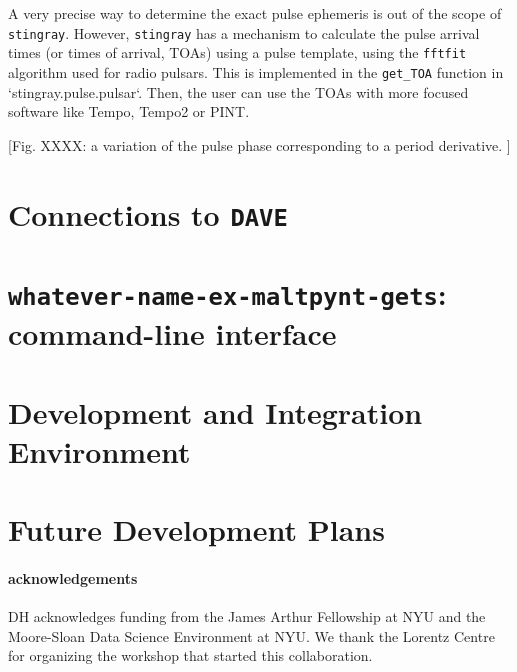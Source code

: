 \documentclass[12pt]{emulateapj}
\newcommand{\stingray}{\texttt{stingray}\xspace}
\newcommand{\maltpynt}{\texttt{whatever-name-ex-maltpynt-gets}\xspace}
\begin{document}
A very precise way to determine the exact pulse ephemeris is out of the scope of \stingray. 
However, \stingray has a mechanism to calculate the pulse arrival times (or times of arrival, TOAs) using a pulse template, using the \texttt{fftfit} algorithm used for radio pulsars. 
This is implemented in the \texttt{get\_TOA} function in `stingray.pulse.pulsar`.
Then, the user can use the TOAs with more focused software like Tempo, Tempo2 or PINT.

[Fig. XXXX: a variation of the pulse phase corresponding to a period derivative. ]

\section{Connections to \texttt{DAVE}}
\label{sec:dave}

\section{\maltpynt: command-line interface}
\label{sec:maltpynt}


\section{Development and Integration Environment}
\label{sec:development}

\section{Future Development Plans}
\label{sec:future}

\paragraph{acknowledgements}
DH acknowledges funding from the James Arthur Fellowship at NYU and the Moore-Sloan Data Science Environment at NYU. 
We thank the Lorentz Centre for organizing the workshop that started this collaboration.
\clearpage



\end{document}
